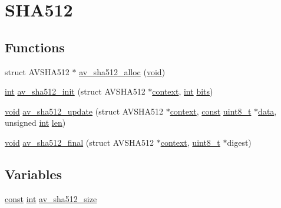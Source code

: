 \hypertarget{group__lavu__sha512}{}\section{S\+H\+A512}
\label{group__lavu__sha512}
\subsection*{Functions}
\begin{DoxyCompactItemize}
\item 
struct A\+V\+S\+H\+A512 $\ast$ \hyperlink{group__lavu__sha512_ga40fcf794737ab4a08be5c4b4bfa95c0e}{av\+\_\+sha512\+\_\+alloc} (\hyperlink{sound_8c_ae35f5844602719cf66324f4de2a658b3}{void})
\item 
\hyperlink{xmltok_8h_a5a0d4a5641ce434f1d23533f2b2e6653}{int} \hyperlink{group__lavu__sha512_ga3cd6e2e5e591440905380dd345058516}{av\+\_\+sha512\+\_\+init} (struct A\+V\+S\+H\+A512 $\ast$\hyperlink{structcontext}{context}, \hyperlink{xmltok_8h_a5a0d4a5641ce434f1d23533f2b2e6653}{int} \hyperlink{metrics_8c_a1eb8fc809d37cc6176f7f27374b063d0}{bits})
\item 
\hyperlink{sound_8c_ae35f5844602719cf66324f4de2a658b3}{void} \hyperlink{group__lavu__sha512_ga101585440840ee0f17d562e024e8ac49}{av\+\_\+sha512\+\_\+update} (struct A\+V\+S\+H\+A512 $\ast$\hyperlink{structcontext}{context}, \hyperlink{getopt1_8c_a2c212835823e3c54a8ab6d95c652660e}{const} \hyperlink{lib-src_2ffmpeg_2win32_2stdint_8h_a9a941819355e6f658991890ff66b4b0e}{uint8\+\_\+t} $\ast$\hyperlink{lib_2expat_8h_ac39e72a1de1cb50dbdc54b08d0432a24}{data}, unsigned \hyperlink{xmltok_8h_a5a0d4a5641ce434f1d23533f2b2e6653}{int} \hyperlink{lib_2expat_8h_af86d325fecfc8f47b61fbf5a5146f582}{len})
\item 
\hyperlink{sound_8c_ae35f5844602719cf66324f4de2a658b3}{void} \hyperlink{group__lavu__sha512_ga445bbd692a0e005d30a09d85f2ffbc69}{av\+\_\+sha512\+\_\+final} (struct A\+V\+S\+H\+A512 $\ast$\hyperlink{structcontext}{context}, \hyperlink{lib-src_2ffmpeg_2win32_2stdint_8h_a9a941819355e6f658991890ff66b4b0e}{uint8\+\_\+t} $\ast$digest)
\end{DoxyCompactItemize}
\subsection*{Variables}
\begin{DoxyCompactItemize}
\item 
\hyperlink{getopt1_8c_a2c212835823e3c54a8ab6d95c652660e}{const} \hyperlink{xmltok_8h_a5a0d4a5641ce434f1d23533f2b2e6653}{int} \hyperlink{group__lavu__sha512_gaa90af4540d2b03a1a122e1d6a8678efe}{av\+\_\+sha512\+\_\+size}
\end{DoxyCompactItemize}



